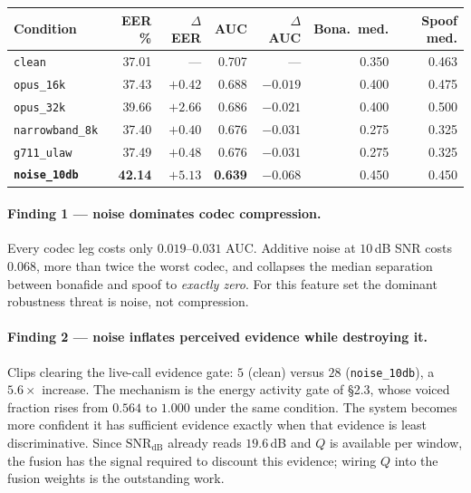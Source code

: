 \documentclass[11pt,a4paper]{article}
\newcommand{\code}[1]{\texttt{\small #1}}
\begin{document}
\begin{center}
\begin{tabular}{@{}lrrrrrr@{}}
\toprule
\textbf{Condition} & \textbf{EER \%} & \textbf{$\Delta$EER} & \textbf{AUC} & \textbf{$\Delta$AUC} & \textbf{Bona.\ med.} & \textbf{Spoof med.}\\
\midrule
\texttt{clean} & 37.01 & --- & 0.707 & --- & 0.350 & 0.463\\
\texttt{opus\_16k} & 37.43 & $+0.42$ & 0.688 & $-0.019$ & 0.400 & 0.475\\
\texttt{opus\_32k} & 39.66 & $+2.66$ & 0.686 & $-0.021$ & 0.400 & 0.500\\
\texttt{narrowband\_8k} & 37.40 & $+0.40$ & 0.676 & $-0.031$ & 0.275 & 0.325\\
\texttt{g711\_ulaw} & 37.49 & $+0.48$ & 0.676 & $-0.031$ & 0.275 & 0.325\\
\textbf{\texttt{noise\_10db}} & \textbf{42.14} & $\mathbf{+5.13}$ & \textbf{0.639} & $\mathbf{-0.068}$ & 0.450 & 0.450\\
\bottomrule
\end{tabular}
\end{center}

\paragraph{Finding 1 --- noise dominates codec compression.}
Every codec leg costs only $0.019$--$0.031$ AUC. Additive noise at $10$\,dB SNR costs
$0.068$, more than twice the worst codec, and collapses the median separation between
bonafide and spoof to \emph{exactly zero}. For this feature set the dominant robustness
threat is noise, not compression.

\paragraph{Finding 2 --- noise inflates perceived evidence while destroying it.}
Clips clearing the live-call evidence gate: $5$ (clean) versus $28$ (\code{noise\_10db}),
a $5.6\times$ increase. The mechanism is the energy activity gate of \S2.3, whose voiced
fraction rises from $0.564$ to $1.000$ under the same condition. The system becomes more
confident it has sufficient evidence exactly when that evidence is least discriminative.
Since $\mathrm{SNR_{dB}}$ already reads $19.6$\,dB and $Q$ is available per window, the
fusion has the signal required to discount this evidence; wiring $Q$ into the fusion
weights is the outstanding work.
\end{document}
